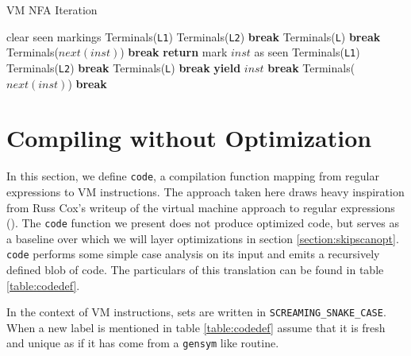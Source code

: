 \begin{algorithm}
\caption{VM NFA Iteration} \label{algo:nfaiter}
\begin{algorithmic}
  \State clear seen markings
      \State Terminals({\tt L1})
      \State Terminals({\tt L2})
      \State \textbf{break}
    \EndCase
      \State Terminals({\tt L})
      \State \textbf{break}
    \EndCase
     \EndCase
     \EndCase
      \State Terminals($next(inst)$)
      \State \textbf{break}
    \EndCase
  \EndSwitch
\EndProcedure
{}
    \State \textbf{return}
  \EndIf
  \State mark $inst$ as seen
      \State Terminals({\tt L1})
      \State Terminals({\tt L2})
      \State \textbf{break}
    \EndCase
      \State Terminals({\tt L})
      \State \textbf{break}
    \EndCase
     \EndCase
      \State \textbf{yield} $inst$
      \State \textbf{break}
    \EndCase
      \State Terminals($next(inst)$)
      \State \textbf{break}
    \EndCase
  \EndSwitch
\EndProcedure
\end{algorithmic}
\end{algorithm}

\section{Compiling without Optimization}
\label{section:compilation}

In this section, we define \verb'code', a compilation function mapping
from regular expressions to VM instructions. The approach taken here
draws heavy inspiration from Russ Cox's writeup of the virtual machine
approach to regular expressions (\cite{CoxVirtualMachineApproach}).
The \verb'code' function we present does not produce optimized code,
but serves as a baseline over which we will layer optimizations
in section \ref{section:skipscanopt}.
\verb'code' performs some simple case analysis on its input and emits a
recursively defined blob of code. The particulars of this translation can
be found in table \ref{table:codedef}.

In the context of VM instructions, sets are written in
\texttt{SCREAMING\allowbreak\_SNAKE\allowbreak\_CASE}.
When a new label is mentioned in table
\ref{table:codedef} assume that it is fresh and unique as if it has
come from a \verb'gensym' like routine.

